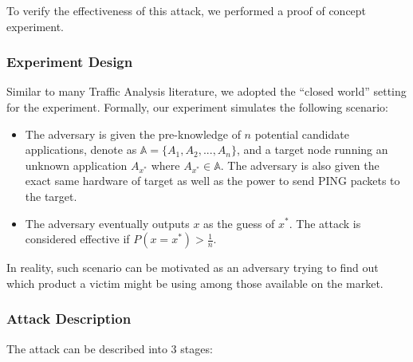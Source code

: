 To verify the effectiveness of this attack, we performed a proof of concept experiment.

\subsubsection{Experiment Design}

Similar to many Traffic Analysis literature, we adopted the ``closed world'' setting for the experiment. Formally, our experiment simulates the following scenario:
\begin{itemize}
 \item The adversary is given the pre-knowledge of $n$ potential candidate applications, denote as $\mathbb{A} = \{A_1, A_2, ..., A_n\}$, and a target node running an unknown application $A_{x^*}$ where $A_{x^*} \in \mathbb{A}$. The adversary is also given the exact same hardware of target as well as the power to send PING packets to the target.
 \item The adversary eventually outputs $x$ as the guess of $x^*$. The attack is considered effective if $P(x = x^*) > \frac{1}{n}$.
\end{itemize}

In reality, such scenario can be motivated as an adversary trying to find out which product a victim might be using among those available on the market.

\subsubsection{Attack Description \label{PingProbeAttackManual}} 

The attack can be described into 3 stages:

